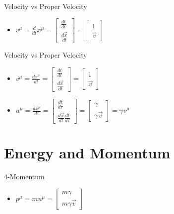 \documentclass[10pt,xcolor={table,dvipsnames},t]{beamer}
\begin{document}
\begin{frame}{Velocity vs Proper Velocity}
    \begin{itemize}
        \item $v^\mu = \frac{d}{dt}x^\mu = \begin{bmatrix} \frac{dt}{dt} \\ \frac{d\Vec{x}}{dt} \end{bmatrix} = \begin{bmatrix} 1 \\ \vec{v} \end{bmatrix}$
    \end{itemize}
\end{frame}

\begin{frame}{Velocity vs Proper Velocity}
    \begin{itemize}
        \item $v^\mu = \frac{dx^\mu}{dt} = \begin{bmatrix} \frac{dt}{dt} \\ \frac{d\Vec{x}}{dt} \end{bmatrix} = \begin{bmatrix} 1 \\ \vec{v} \end{bmatrix}$
        \item $u^\mu = \frac{dx^\mu}{d\tau} = \begin{bmatrix} \frac{dt}{d\tau} \\ \frac{d\Vec{x}}{dt}\frac{dt}{d\tau} \end{bmatrix} = \begin{bmatrix} \gamma \\ \gamma \vec{v} \end{bmatrix} = \gamma v^\mu$
    \end{itemize}
\end{frame}

\section{Energy and Momentum}

\begin{frame}{4-Momentum}
    \begin{itemize}
        \item $p^\mu = m u^\mu = \begin{bmatrix} m\gamma \\ m\gamma \vec{v} \end{bmatrix}$
    \end{itemize}
\end{frame}
\end{document}
